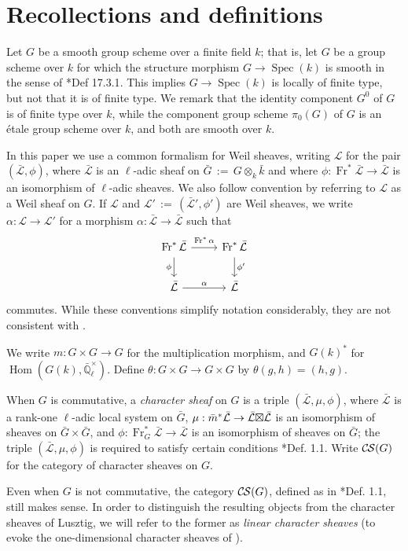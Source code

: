 \documentclass[10pt]{amsart}
\theoremstyle{plain}
\theoremstyle{definition}
\newcommand{\EE}{\mathbb{\bar Q}_\ell}
\newcommand{\bFq}{\bar{k}}
\newcommand{\Fq}{k}
\newcommand{\EEx}{\EE^\times}
\newcommand{\Frob}[1]{\operatorname{Fr}_{#1}}
\DeclareMathOperator{\Hom}{Hom}
\newcommand{\Spec}[1]{{\operatorname{Spec}(#1)}}
\newcommand{\ceq}{{\, :=\, }}
\newcommand{\cs}[1]{{\mathcal{#1}}}
\newcommand{\gcs}[1]{{\mathcal{\bar #1}}}
\newcommand{\CS}{{\mathcal{C\hskip-0.8pt S}}}
\newcommand{\bm}{\bar{m}}
\newcommand{\bG}{\bar{G}}
\newcommand{\tight}[3]{\hspace{-#1pt}{#2}\hspace{-#3pt}}
\newcommand{\LxL}{\text{$\gcs{L} \tight{0}{\boxtimes}{0} \gcs{L}$}}
\begin{document}
\section{Recollections and definitions} \label{sec:defs}

Let $G$ be a smooth group scheme over a finite field $\Fq$; that is, let $G$ be a group scheme over $\Fq$
for which the structure morphism $G \to \Spec{\Fq}$ is smooth in the sense of \cite{EGAIV4}*{Def 17.3.1}.
This implies $G \to \Spec{\Fq}$ is locally of finite type, but not that it is of finite type.
We remark that the identity component $G^0$ of $G$ is of finite type over $\Fq$, while the component group scheme
$\pi_0(G)$ of $G$ is an \'etale group scheme over $\Fq$, and both are smooth over $\Fq$.

In this paper we use a common formalism for Weil sheaves, writing $\cs{L}$ for the pair $(\gcs{L},\phi)$, where $\gcs{L}$ is an $\ell$-adic sheaf on $\bG \ceq G\otimes_{\Fq} \bFq$ and where $\phi : \Frob{}^*\gcs{L} \to \gcs{L}$ is an isomorphism of $\ell$-adic sheaves. 
We also follow convention by referring to $\cs{L}$  as a Weil sheaf on $G$. 
If $\cs{L}$ and $\cs{L}' \ceq (\gcs{L}', \phi')$ are Weil sheaves, we write $\alpha : \cs{L} \to \cs{L}'$ for a morphism $\alpha : \gcs{L} \to \gcs{L}$ such that 
\[
\begin{tikzcd}
\Frob{}^* \gcs{L} \arrow{d}[swap]{\phi} \arrow{r}{\Frob{}^*\alpha} &  \Frob{}^* \gcs{L} \arrow{d}{\phi'}\\
\gcs{L} \arrow{r}{\alpha} & \gcs{L}
\end{tikzcd}
\]
commutes.  While these conventions simplify notation considerably, they are not consistent with \cite{cunningham-roe:13a}.

We write $m : G \times G \to G$ for the multiplication morphism, and $G(k)^*$ for $\Hom(G(k), \EEx)$.
Define $\theta : G\times G \to G\times G$ by $\theta(g,h) = (h,g)$.

When $G$ is commutative, a \emph{character sheaf} on $G$ is a triple $(\gcs{L}, \mu, \phi)$,
where $\gcs{L}$ is a rank-one $\ell$-adic local system on $\bG$, 
$\mu : \bm^* \gcs{L} \to \LxL$ is an isomorphism
of sheaves on $\bG \times \bG$, 
and $\phi : \Frob{G}^* \gcs{L} \to \gcs{L}$ is an isomorphism of sheaves on $\bG$;
the triple $(\gcs{L}, \mu, \phi)$ is required to satisfy certain conditions \cite{cunningham-roe:13a}*{Def. 1.1}.
Write $\CS(G)$ for the category of character sheaves on $G$.

Even when $G$ is not commutative, the category $\CS(G)$, defined as in \cite{cunningham-roe:13a}*{Def. 1.1},
still makes sense.  In order to distinguish the resulting objects from
the character sheaves of Lusztig, we will refer to the former as \emph{linear character sheaves}
(to evoke the one-dimensional character sheaves of \cite{kamgarpour:09a}).
\end{document}
